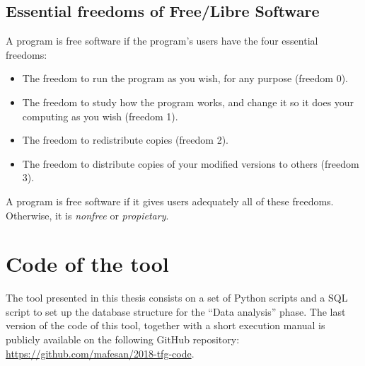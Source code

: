 \documentclass[a4paper, 12pt]{book}
\begin{document}
\section{Essential freedoms of Free/Libre Software}
\label{sec:freedoms}
A program is free software if the program's users have the four essential freedoms:
\begin{itemize}
   \item The freedom to run the program as you wish, for any purpose (freedom 0).
   \item The freedom to study how the program works, and change it so it does your computing as you wish (freedom 1).
   \item The freedom to redistribute copies (freedom 2).
   \item The freedom to distribute copies of your modified versions to others (freedom 3).
\end{itemize}
A program is free software if it gives users adequately all of these freedoms. Otherwise, it is \textit{nonfree} or \textit{propietary}.
\chapter{Code of the tool}
\label{app:code}
The tool presented in this thesis consists on a set of Python scripts and a SQL script to set up the database structure for the
``Data analysis'' phase.
The last version of the code of this tool, together with a short execution manual is publicly available on the following GitHub repository:
\newline \url{https://github.com/mafesan/2018-tfg-code}.
\end{document}
